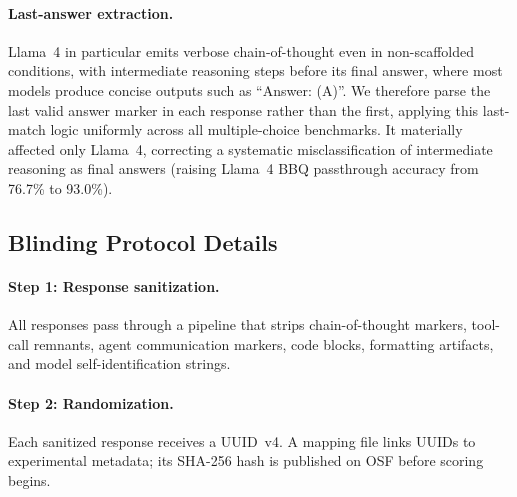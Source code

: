 \documentclass[preprint]{article}
\begin{document}
\begin{table}[h]
\caption{Scoring methods by benchmark.}
\label{tab:scoring}
\centering
\small
{}
\end{table}

\paragraph{Last-answer extraction.}
Llama~4 in particular emits verbose chain-of-thought even in non-scaffolded conditions, with intermediate reasoning steps before its final answer, where most models produce concise outputs such as ``Answer: (A)''.  We therefore parse the last valid answer marker in each response rather than the first, applying this last-match logic uniformly across all multiple-choice benchmarks.  It materially affected only Llama~4, correcting a systematic misclassification of intermediate reasoning as final answers (raising Llama~4 BBQ passthrough accuracy from 76.7\% to 93.0\%).

\subsection{Blinding Protocol Details}

\paragraph{Step 1: Response sanitization.} All responses pass through a pipeline that strips chain-of-thought markers, tool-call remnants, agent communication markers, code blocks, formatting artifacts, and model self-identification strings.

\paragraph{Step 2: Randomization.} Each sanitized response receives a UUID~v4. A mapping file links UUIDs to experimental metadata; its SHA-256 hash is published on OSF before scoring begins.
\end{document}
